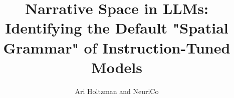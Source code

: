 \documentclass{article}
\title{Narrative Space in LLMs: Identifying the Default "Spatial Grammar" of Instruction-Tuned Models}
\author{Ari Holtzman and NeuriCo}
\begin{document}
\maketitle

\begin{abstract}

\end{abstract}









\end{document}
